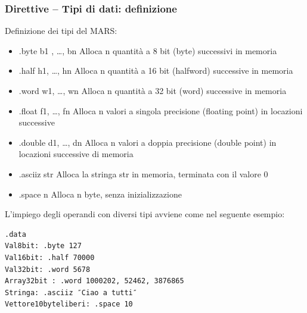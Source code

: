 \documentclass[12pt]{article}
\begin{document}
\subsubsection{Direttive – Tipi di dati: definizione}
Definizione dei tipi del MARS:
\begin{itemize}
\item .byte b1 , …, bn Alloca n quantità a 8 bit (byte) successivi in memoria
\item .half h1, …, hn Alloca n quantità a 16 bit (halfword) successive in memoria
\item .word w1, …, wn Alloca n quantità a 32 bit (word) successive in memoria
\item .float f1, …, fn Alloca n valori a singola precisione (floating point) in locazioni successive 
\item .double d1, …, dn Alloca n valori a doppia precisione (double point) in locazioni successive di memoria
\item .asciiz str Alloca la stringa str in memoria, terminata con il valore 0
\item .space n Alloca n byte, senza inizializzazione\par\medskip\noindent 
\end{itemize}
L’impiego degli operandi con diversi tipi avviene come nel seguente esempio:
\begin{lstlisting}
.data
Val8bit: .byte 127
Val16bit: .half 70000
Val32bit: .word 5678
Array32bit : .word 1000202, 52462, 3876865
Stringa: .asciiz ″Ciao a tutti″
Vettore10byteliberi: .space 10
\end{lstlisting}
\vspace{\baselineskip}
\end{document}
